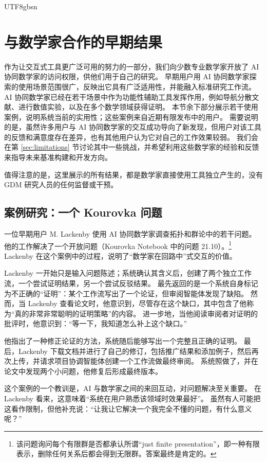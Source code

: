 \documentclass[11pt, a4paper, copyright, gdm]{google}
\begin{document}
\begin{CJK*}{UTF8}{gbsn}
\section{与数学家合作的早期结果}
\label{sec:early_results}

作为让交互式工具更广泛可用的努力的一部分，我们向少数专业数学家开放了 AI 协同数学家的访问权限，供他们用于自己的研究。
早期用户用 AI 协同数学家探索的使用场景范围很广，反映出它具有广泛适用性，并能融入标准研究工作流。
AI 协同数学家已经在若干场景中作为功能性辅助工具发挥作用，例如导航分散文献、进行数值实验，以及在多个数学领域获得证明。
本节余下部分展示若干使用案例，说明系统当前的实用性；这些案例来自近期有限发布中的用户。
需要说明的是，虽然许多用户与 AI 协同数学家的交互成功导向了新发现，但用户对该工具的反馈和满意度存在差异，也有其他用户认为它对自己的工作效果较弱。
我们会在第 \ref{sec:limitations} 节讨论其中一些挑战，并希望利用这些数学家的经验和反馈来指导未来基准构建和开发方向。

值得注意的是，这里展示的所有结果，都是数学家直接使用工具独立产生的，没有 GDM 研究人员的任何监督或干预。


\subsection{案例研究：一个 Kourovka 问题}


一位早期用户 M. Lackenby 使用 AI 协同数学家调查拓扑和群论中的若干问题。
他的工作解决了一个开放问题（Kourovka Notebook 中的问题 21.10）。\footnote{该问题询问每个有限群是否都承认所谓“just finite presentation”，即一种有限表示，删除任何关系后都会得到无限群。答案最终是肯定的。}
Lackenby 在这个案例中的过程，说明了“数学家在回路中”式交互的价值。

Lackenby 一开始只是输入问题陈述；系统确认其含义后，创建了两个独立工作流，一个尝试证明结果，另一个尝试反驳结果。
最先返回的是一个系统自身标记为不正确的“证明”：某个工作流写出了一个论证，但审阅智能体发现了缺陷。
然而，当 Lackenby 查看论文时，他意识到，尽管存在这个缺口，其中包含了他称为“真的非常非常聪明的证明策略”的内容。
进一步地，当他阅读审阅者对证明的批评时，他意识到：“等一下，我知道怎么补上这个缺口。”

他指出了一种修正论证的方法，系统随后能够写出一个完整且正确的证明。
最后，Lackenby 下载文档并进行了自己的修订，包括推广结果和添加例子，然后再次上传，并请求项目协调智能体创建一个工作流做最终审阅。
系统照做了，并在论文中发现两个小问题，他修复后形成最终版本。

这个案例的一个教训是，AI 与数学家之间的来回互动，对问题解决至关重要。
在 Lackenby 看来，这意味着“系统在用户熟悉该领域时效果最好”。
虽然有人可能把这看作限制，但他补充说：“让我让它解决一个我完全不懂的问题，有什么意义呢？”


\end{CJK*}
\end{document}
